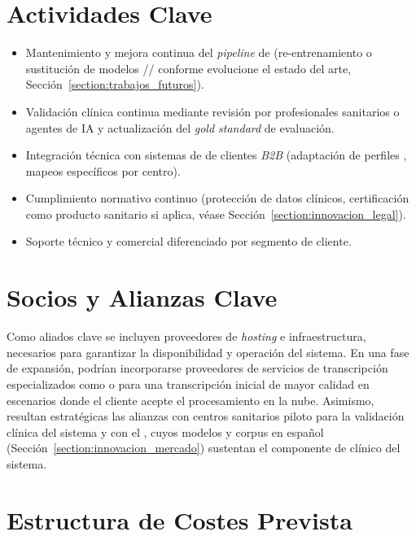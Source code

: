 \section{Actividades Clave}\label{section:innovacion_actividades}

\begin{itemize}
    \item Mantenimiento y mejora continua del \textit{pipeline} de  (re-entrenamiento
    o sustitución de modelos // conforme evolucione
    el estado del arte, Sección~\ref{section:trabajos_futuros}).
    \item Validación clínica continua mediante revisión por profesionales sanitarios o agentes de IA y actualización
    del \textit{gold standard} de evaluación.
    \item Integración técnica con sistemas de  de clientes \textit{B2B} (adaptación de
    perfiles , mapeos específicos por centro).
    \item Cumplimiento normativo continuo (protección de datos clínicos, certificación como producto
    sanitario si aplica, véase Sección~\ref{section:innovacion_legal}).
    \item Soporte técnico y comercial diferenciado por segmento de cliente.
\end{itemize}

\section{Socios y Alianzas Clave}\label{section:innovacion_alianzas}

Como aliados clave se incluyen proveedores de \textit{hosting} e infraestructura, necesarios para
garantizar la disponibilidad y operación del sistema. En una fase de expansión, podrían incorporarse
proveedores de servicios de
transcripción especializados como  o 
para una transcripción inicial de mayor calidad en escenarios donde el cliente acepte el procesamiento
en la nube. Asimismo, resultan estratégicas las alianzas con centros sanitarios piloto para la
validación clínica del sistema y con el , cuyos
modelos y corpus en español (Sección~\ref{section:innovacion_mercado}) sustentan el componente de
 clínico del sistema.

\section{Estructura de Costes Prevista}\label{section:innovacion_costes}

